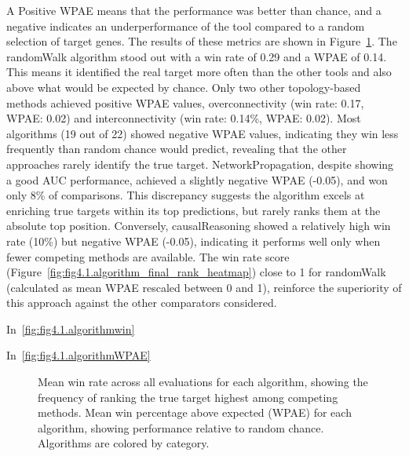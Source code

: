 A Positive WPAE means that the performance was better than chance, and a negative indicates an underperformance of the tool compared to a random selection of target genes. The results of these metrics are shown in Figure~\ref{fig:fig4.3.Win_and_WPAE}. The randomWalk algorithm stood out with a win rate of 0.29 and a WPAE of 0.14. This means it identified the real target more often than the other tools and also above what would be expected by chance. Only two other topology-based methods achieved positive WPAE values, overconnectivity (win rate: 0.17, WPAE: 0.02) and interconnectivity (win rate: 0.14\%, WPAE: 0.02).  Most algorithms (19 out of 22) showed negative WPAE values, indicating they win less frequently than random chance would predict, revealing that the other approaches rarely identify the true target. NetworkPropagation, despite showing a good \gls{AUC} performance, achieved a slightly negative WPAE (-0.05), and won only 8\% of comparisons. This discrepancy suggests the algorithm excels at enriching true targets within its top predictions, but rarely ranks them at the absolute top position. Conversely, causalReasoning showed a relatively high win rate (10\%) but negative WPAE (-0.05), indicating it performs well only when fewer competing methods are available. The win rate score (Figure~\ref{fig:fig4.1.algorithm_final_rank_heatmap}) close to 1 for randomWalk (calculated as mean WPAE rescaled between 0 and 1), reinforce the superiority of this approach against the other comparators considered.

In~\ref{fig:fig4.1.algorithmwin}

In~\ref{fig:fig4.1.algorithmWPAE}

\begin{figure}[htbp]
  \centering
  \caption[Mean win rate across all evaluations for each algorithm.]{Mean win rate across all evaluations for each algorithm, showing the frequency of ranking the true target highest among competing methods. Mean win percentage above expected (WPAE) for each algorithm, showing performance relative to random chance. Algorithms are colored by category.}
  \label{fig:fig4.3.Win_and_WPAE}
\end{figure}

